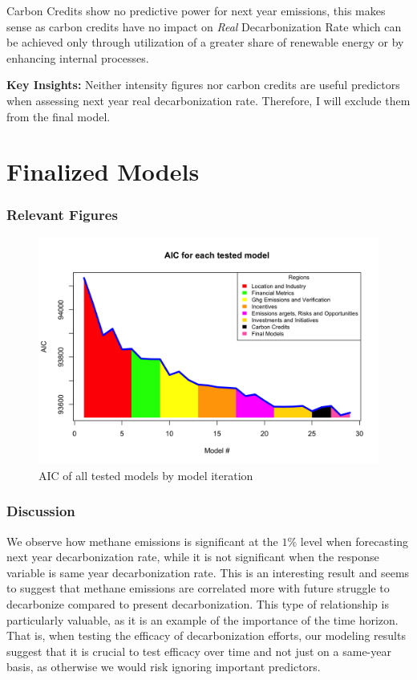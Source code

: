 Carbon Credits show no predictive power for next year emissions, this makes sense as carbon credits have no impact on \textit{Real} Decarbonization Rate which can be achieved only through utilization of a greater share of renewable energy or by enhancing internal processes.

\textbf{Key Insights: } Neither intensity figures nor carbon credits are useful predictors when assessing next year real decarbonization rate. Therefore, I will exclude them from the final model.


\section{Finalized Models}



\subsubsection{Relevant Figures}

\begin{figure}[H]
    \centering
    \includegraphics[width=\linewidth]{../notebooks/R/aic.png}
    \caption{AIC of all tested models by model iteration}
    \label{AIC}
\end{figure}

\subsubsection{Discussion}
We observe how methane emissions is significant at the $1\%$ level when forecasting next year decarbonization rate, while it is not significant when the response variable is same year decarbonization rate. This is an interesting result and seems to suggest that methane emissions are correlated more with future struggle to decarbonize compared to present decarbonization. This type of relationship is particularly valuable, as it is an example of the importance of the time horizon. That is, when testing the efficacy of decarbonization efforts, our modeling results suggest that it is crucial to test efficacy over time and not just on a same-year basis, as otherwise we would risk ignoring important predictors.


